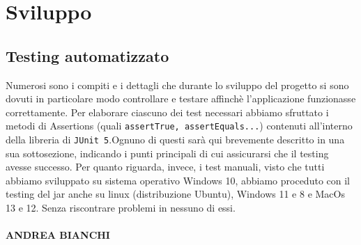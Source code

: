 \documentclass[a4paper,12pt]{report}
\begin{document}
\chapter{Sviluppo}
\section{Testing automatizzato}
Numerosi sono i compiti e i dettagli che durante lo sviluppo del progetto si sono dovuti in particolare modo controllare e testare affinchè l'applicazione funzionasse correttamente. Per elaborare ciascuno dei test necessari abbiamo sfruttato i metodi di Assertions (quali \verb|assertTrue, assertEquals...|) contenuti all'interno della libreria di \verb|JUnit 5|.Ognuno di questi sarà qui brevemente descritto in una sua sottosezione, indicando i punti principali di cui assicurarsi che il testing avesse successo.
Per quanto riguarda, invece, i test manuali, visto che tutti abbiamo sviluppato su sistema operativo Windows 10, abbiamo proceduto con il testing del jar anche su linux (distribuzione Ubuntu), Windows 11 e 8 e MacOs 13 e 12. Senza riscontrare problemi in nessuno di essi. 
\\ \\
\textbf{ANDREA BIANCHI}
\end{document}
